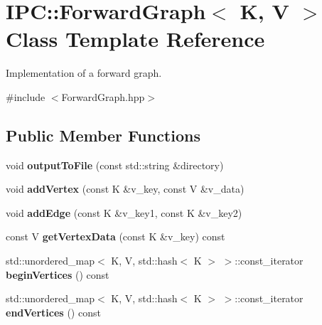\hypertarget{class_i_p_c_1_1_forward_graph}{}\section{I\+PC\+:\+:Forward\+Graph$<$ K, V $>$ Class Template Reference}
\label{class_i_p_c_1_1_forward_graph}


Implementation of a forward graph.  




{\ttfamily \#include $<$Forward\+Graph.\+hpp$>$}

\subsection*{Public Member Functions}
\begin{DoxyCompactItemize}
\item 
void {\bfseries output\+To\+File} (const std\+::string \&directory)\hypertarget{class_i_p_c_1_1_forward_graph_ad377d409fd61025afb9ea0df55c437e3}{}\label{class_i_p_c_1_1_forward_graph_ad377d409fd61025afb9ea0df55c437e3}

\item 
void {\bfseries add\+Vertex} (const K \&v\+\_\+key, const V \&v\+\_\+data)\hypertarget{class_i_p_c_1_1_forward_graph_a4fdef56cce1751575bf563dc22e48c11}{}\label{class_i_p_c_1_1_forward_graph_a4fdef56cce1751575bf563dc22e48c11}

\item 
void {\bfseries add\+Edge} (const K \&v\+\_\+key1, const K \&v\+\_\+key2)\hypertarget{class_i_p_c_1_1_forward_graph_a024fa0652056350aa293e810bcd339e1}{}\label{class_i_p_c_1_1_forward_graph_a024fa0652056350aa293e810bcd339e1}

\item 
const V {\bfseries get\+Vertex\+Data} (const K \&v\+\_\+key) const \hypertarget{class_i_p_c_1_1_forward_graph_ad882a4d7bb06dea57c3afe8879b39fd3}{}\label{class_i_p_c_1_1_forward_graph_ad882a4d7bb06dea57c3afe8879b39fd3}

\item 
std\+::unordered\+\_\+map$<$ K, V, std\+::hash$<$ K $>$ $>$\+::const\+\_\+iterator {\bfseries begin\+Vertices} () const \hypertarget{class_i_p_c_1_1_forward_graph_a352e7c6ab39de3d26c708af7d31d0184}{}\label{class_i_p_c_1_1_forward_graph_a352e7c6ab39de3d26c708af7d31d0184}

\item 
std\+::unordered\+\_\+map$<$ K, V, std\+::hash$<$ K $>$ $>$\+::const\+\_\+iterator {\bfseries end\+Vertices} () const \hypertarget{class_i_p_c_1_1_forward_graph_a2bec703bb20906f1e5cd915961f42db5}{}\label{class_i_p_c_1_1_forward_graph_a2bec703bb20906f1e5cd915961f42db5}


\end{DoxyCompactItemize}
